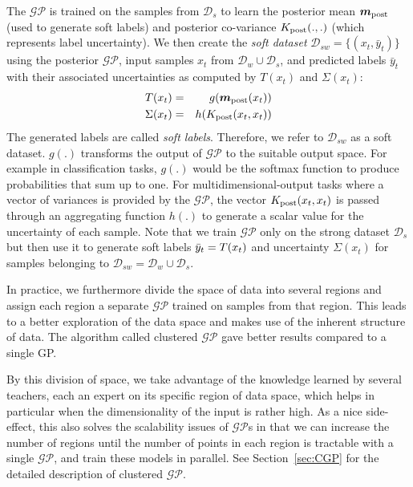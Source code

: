 The $\mathcal{GP}$ is trained on the samples from $\mathcal{D}_s$ to learn the posterior mean $\bm{m}_{\rm post}$ (used to generate soft labels) and posterior co-variance $K_{\rm post}(.,.)$ (which represents label uncertainty).
We then create the \emph{soft dataset} $\mathcal{D}_{sw}=\{(x_t,\bar{y}_t)\}$ using the posterior $\mathcal{GP}$, input samples $x_t$ from $\mathcal{D}_w \cup \mathcal{D}_s$, and predicted labels $\bar{y}_t$ with their associated uncertainties as computed by $T(x_t)$ and $\Sigma(x_t)$:
\begin{eqnarray*}
\tfunc(x_t) &=& g(\bm{m}_{\rm post}(x_t))\\
\Sigma(x_t) &=& h(K_{\rm post}(x_t,x_t))
\sshrink
\end{eqnarray*}
The generated labels are called \emph{soft labels}. Therefore, we refer to $\mathcal{D}_{sw}$ as a soft dataset. $g(.)$ transforms the output of $\mathcal{GP}$ to the suitable output space. For example in classification tasks, $g(.)$ would be the softmax function to produce probabilities that sum up to one. 
For multidimensional-output tasks where a vector of variances is provided by the $\mathcal{GP}$, the vector $K_{\rm post}(x_t,x_t)$ is passed through an aggregating function $h(.)$ to generate a scalar value for the uncertainty of each sample. 
Note that we train $\mathcal{GP}$ only on the strong dataset $\mathcal{D}_s$ but then use it to generate soft labels $\bar{y}_t = T(x_t)$ and uncertainty $\Sigma(x_t)$ for samples belonging to $\mathcal{D}_{sw}=\mathcal{D}_w\cup \mathcal{D}_s$.

In practice, we furthermore divide the space of data into several regions and assign each region a separate $\mathcal{GP}$ trained on samples from that region. This leads to a better exploration of the data space and makes use of the inherent structure of data. The algorithm called clustered $\mathcal{GP}$ gave better results compared to a single GP. 

By this division of space, we take advantage of the knowledge learned by several teachers, each an expert on its specific region of data space, which helps in particular when the dimensionality of the input is rather high. As a nice side-effect, this also solves the scalability issues of $\mathcal{GP}$s in that we can increase the number of regions until the number of points in each region is tractable with a single $\mathcal{GP}$, and train these models in parallel. See Section~\ref{sec:CGP} for the detailed description of clustered $\mathcal{GP}$.

